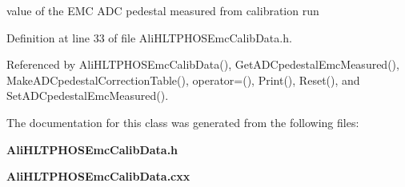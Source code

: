 value of the EMC ADC pedestal measured from calibration run 

Definition at line 33 of file Ali\-HLTPHOSEmc\-Calib\-Data.h.

Referenced by Ali\-HLTPHOSEmc\-Calib\-Data(), Get\-ADCpedestal\-Emc\-Measured(), Make\-ADCpedestal\-Correction\-Table(), operator=(), Print(), Reset(), and Set\-ADCpedestal\-Emc\-Measured().

The documentation for this class was generated from the following files:\begin{CompactItemize}
\item 
{\bf Ali\-HLTPHOSEmc\-Calib\-Data.h}\item 
{\bf Ali\-HLTPHOSEmc\-Calib\-Data.cxx}\end{CompactItemize}

